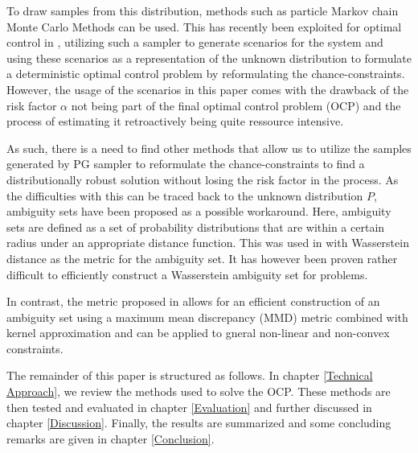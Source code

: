 To draw samples from this distribution, methods such as particle Markov chain Monte Carlo Methods \cite{Andrieu_10} can be used. This has recently been exploited for optimal control in \cite{Robert_24} , utilizing such a sampler to generate scenarios for the system and using these scenarios as a representation of the unknown distribution to formulate a deterministic optimal control problem by reformulating the chance-constraints. However, the usage of the scenarios in this paper comes with the drawback of the risk factor $\alpha$ not being part of the final optimal control problem (OCP) and the process of estimating it retroactively being quite ressource intensive.

As such, there is a need to find other methods that allow us to utilize the samples generated by PG sampler to reformulate the chance-constraints to find a distributionally robust solution without losing the risk factor in the process. As the difficulties with this can be traced back to the unknown distribution $P$, ambiguity sets have been proposed as a possible workaround. Here, ambiguity sets are defined as a set of probability distributions that are within a certain radius under an appropriate distance function. This was used in \cite{Hota_19} with Wasserstein distance as the metric for the ambiguity set. It has however been proven rather difficult to efficiently construct a Wasserstein ambiguity set for problems. 

In contrast, the metric proposed in \cite{Yassine_22} allows for an efficient construction of an ambiguity set using a maximum mean discrepancy (MMD) metric combined with kernel approximation and can be applied to gneral non-linear and non-convex constraints.

The remainder of this paper is structured as follows. In chapter \ref{Technical Approach}, we review the methods used to solve the OCP. These methods are then tested and evaluated in chapter \ref{Evaluation} and further discussed in chapter \ref{Discussion}. Finally, the results are summarized and some concluding remarks are given in chapter \ref{Conclusion}.




